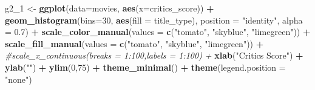 \documentclass[]{article}
\newenvironment{Shaded}{\begin{snugshade}}{\end{snugshade}}
\newcommand{\KeywordTok}[1]{\textcolor[rgb]{0.13,0.29,0.53}{\textbf{#1}}}
\newcommand{\DataTypeTok}[1]{\textcolor[rgb]{0.13,0.29,0.53}{#1}}
\newcommand{\DecValTok}[1]{\textcolor[rgb]{0.00,0.00,0.81}{#1}}
\newcommand{\FloatTok}[1]{\textcolor[rgb]{0.00,0.00,0.81}{#1}}
\newcommand{\StringTok}[1]{\textcolor[rgb]{0.31,0.60,0.02}{#1}}
\newcommand{\CommentTok}[1]{\textcolor[rgb]{0.56,0.35,0.01}{\textit{#1}}}
\newcommand{\OperatorTok}[1]{\textcolor[rgb]{0.81,0.36,0.00}{\textbf{#1}}}
\newcommand{\NormalTok}[1]{#1}
\begin{document}
\begin{Shaded}
\begin{Highlighting}[]
\NormalTok{g2_}\DecValTok{1}\NormalTok{ <-}\StringTok{ }\KeywordTok{ggplot}\NormalTok{(}\DataTypeTok{data=}\NormalTok{movies, }\KeywordTok{aes}\NormalTok{(}\DataTypeTok{x=}\NormalTok{critics_score)) }\OperatorTok{+}
\StringTok{  }\KeywordTok{geom_histogram}\NormalTok{(}\DataTypeTok{bins=}\DecValTok{30}\NormalTok{, }\KeywordTok{aes}\NormalTok{(}\DataTypeTok{fill =}\NormalTok{ title_type), }\DataTypeTok{position =} \StringTok{"identity"}\NormalTok{, }\DataTypeTok{alpha =} \FloatTok{0.7}\NormalTok{) }\OperatorTok{+}
\StringTok{  }\KeywordTok{scale_color_manual}\NormalTok{(}\DataTypeTok{values =} \KeywordTok{c}\NormalTok{(}\StringTok{"tomato"}\NormalTok{, }\StringTok{"skyblue"}\NormalTok{, }\StringTok{"limegreen"}\NormalTok{)) }\OperatorTok{+}
\StringTok{  }\KeywordTok{scale_fill_manual}\NormalTok{(}\DataTypeTok{values =} \KeywordTok{c}\NormalTok{(}\StringTok{"tomato"}\NormalTok{, }\StringTok{"skyblue"}\NormalTok{, }\StringTok{"limegreen"}\NormalTok{)) }\OperatorTok{+}
\StringTok{  }\CommentTok{#scale_x_continuous(breaks = 1:100,labels = 1:100) + }
\StringTok{  }\KeywordTok{xlab}\NormalTok{(}\StringTok{"Critics Score"}\NormalTok{) }\OperatorTok{+}
\StringTok{  }\KeywordTok{ylab}\NormalTok{(}\StringTok{""}\NormalTok{) }\OperatorTok{+}
\StringTok{  }\KeywordTok{ylim}\NormalTok{(}\DecValTok{0}\NormalTok{,}\DecValTok{75}\NormalTok{) }\OperatorTok{+}
\StringTok{  }\KeywordTok{theme_minimal}\NormalTok{() }\OperatorTok{+}
\StringTok{  }\KeywordTok{theme}\NormalTok{(}\DataTypeTok{legend.position =} \StringTok{"none"}\NormalTok{)}


\end{Highlighting}
\end{Shaded}
\end{document}

